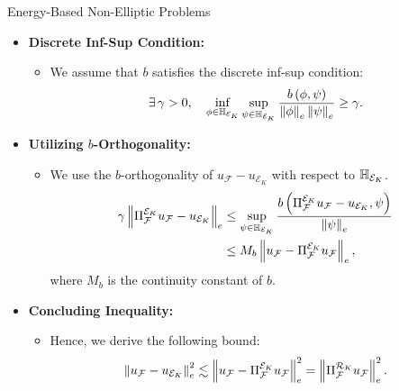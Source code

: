\begin{frame}{Energy-Based Non-Elliptic Problems}

\begin{itemize}
  \item \textbf{Discrete Inf-Sup Condition:}
    \begin{itemize}
      \item We assume that $b$ satisfies the discrete inf-sup condition:
      \begin{equation}
        \exists \, \gamma > 0, \quad \inf_{\phi \in \mathbb{H}_{\mathcal{E}_K}}\sup_{\psi \in \mathbb{H}_{\mathcal{E}_K}}\frac{b\left(\phi, \psi\right)}{\left\|\phi\right\|_{e}\left\|\psi\right\|_{e}} \geq \gamma.
        \label{eq:infsup}
      \end{equation}
    \end{itemize}

  \item \textbf{Utilizing $b$-Orthogonality:}
    \begin{itemize}
      \item We use the $b$-orthogonality of $u_{\mathcal{F}}-u_{\mathcal{E}_K}$ with respect to $\mathbb{H}_{\mathcal{E}_K}$.
      \begin{align}
        \gamma\left\|\Pi_{\mathcal{F}}^{\mathcal{E}_K}u_{\mathcal{F}}-u_{\mathcal{E}_K}\right\|_e & \leq \sup_{\psi \in \mathbb{H}_{\mathcal{E}_K}}\frac{b\left(\Pi_{\mathcal{F}}^{\mathcal{E}_K}u_{\mathcal{F}}-u_{\mathcal{E}_K}, \psi\right)}{\left\|\psi\right\|_{e}} \\
        & \leq M_b \left\|u_{\mathcal{F}}-\Pi_{\mathcal{F}}^{\mathcal{E}_K}u_{\mathcal{F}}\right\|_e,
      \end{align}
      where $M_b$ is the continuity constant of $b$.
    \end{itemize}

  \item \textbf{Concluding Inequality:}
    \begin{itemize}
      \item Hence, we derive the following bound:
      \begin{equation}
        \left\|u_{\mathcal{F}}-u_{\mathcal{E}_K}\right\|_e^2 \lesssim \left\|u_{\mathcal{F}}-\Pi_{\mathcal{F}}^{\mathcal{E}_K}u_{\mathcal{F}}\right\|_e^2=\left\|\Pi_{\mathcal{F}}^{\mathcal{R}_K}u_{\mathcal{F}}\right\|_e^2.
        \label{eq:en_ne_bound}
      \end{equation}
    \end{itemize}
\end{itemize}

\end{frame}


